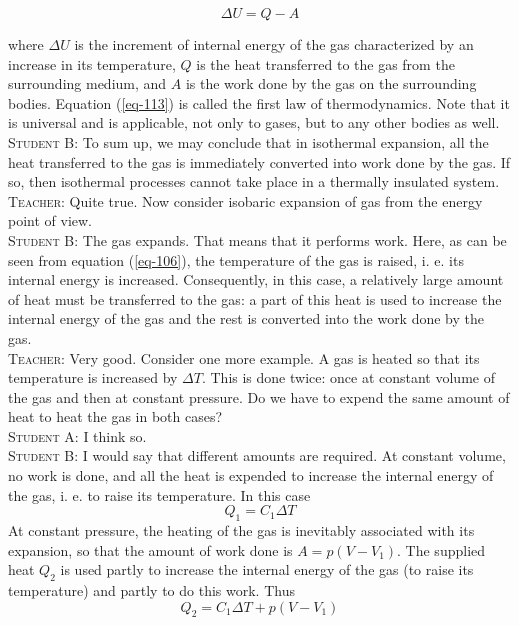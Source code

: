 \documentclass[a4paper,sfsidenotes]{tufte-book}
\begin{document}
\begin{equation}%
\Delta U = Q - A
\label{eq-113}
\end{equation}

where $\Delta U$ is the increment of internal energy of the gas characterized by an increase in its temperature, $Q$ is the heat transferred to the gas from the surrounding medium, and $A$ is the work done by the gas on the surrounding bodies. Equation (\ref{eq-113}) is called the first law of thermodynamics. Note that it is universal and is applicable, not only to gases, but to any other bodies as well.
\\
\textsc{Student B:} To sum up, we may conclude that in isothermal expansion, all the heat transferred to the gas is immediately converted into work done by the gas. If so, then isothermal processes cannot take place in a thermally insulated system.
\\
\textsc{Teacher:} Quite true. Now consider isobaric expansion of gas from the energy point of view.
\\
\textsc{Student B:} The gas expands. That means that it performs work. Here, as can be seen from equation (\ref{eq-106}), the temperature of the gas is raised, i. e. its internal energy is increased. Consequently, in this case, a relatively large amount of heat must be transferred to the gas: a part of this heat is used to increase the internal energy of the gas and the rest is converted into the work done by the gas.
\\
\textsc{Teacher:} Very good. Consider one more example. A gas is heated so that its temperature is increased by $\Delta T$. This is done twice: once at constant volume of the gas and then at constant pressure. Do we have to expend the same amount of heat to heat the gas in both cases?
\\
\textsc{Student A:} I think so.
\\
\textsc{Student B:} I would say that different amounts are required. At constant volume, no work is done, and all the heat is expended to increase the internal energy of the gas, i. e. to raise its temperature. In this case
\begin{equation}%
Q_{1} = C_{1} \Delta T
\label{114}
\end{equation}
At constant pressure, the heating of the gas is inevitably associated with its expansion, so that the amount of work done is $A=p(V-V_{1})$. The supplied heat $Q_{2}$ is used partly to increase the internal energy of the gas (to raise its temperature) and partly to do this work. Thus
\begin{equation}%
Q_{2} = C_{1} \Delta T + p(V-V_{1})
\label{eq-115}
\end{equation}
\end{document}
